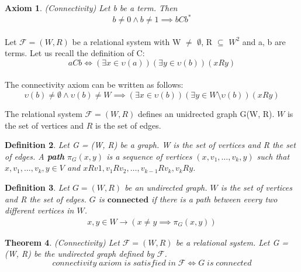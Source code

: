 \documentclass{article}
\newcommand\F{\mathcal{F}}
\newtheorem{theorem}{Theorem}[section]
\newtheorem{axiom}[theorem]{Axiom}
\newtheorem{defn}[theorem]{Definition}
\begin{document}
	\begin{axiom}
		(Connectivity) Let b be a term. Then
		\label{connectivity-theorem}\begin{equation}
			b \neq 0 \land b \neq 1 \implies bCb^*
		\end{equation}
	\end{axiom}

	\paragraph{} Let $\F = (W, R)$ be a relational system with W $\neq$ $\emptyset$, R $\subseteq$ $W^2$ and a, b are terms. Let us recall the definition of C:
	\begin{equation*}
		aCb \iff (\exists x \in \upsilon(a)) (\exists y \in \upsilon(b))(xRy)
	\end{equation*}

	\paragraph{} The connectivity axiom can be written as follows:
	\begin{equation}
		\upsilon(b) \neq \emptyset \land \upsilon(b) \neq W \implies (\exists x \in \upsilon(b)) (\exists y \in W \setminus \upsilon(b))(xRy)
	\end{equation}

	The relational system $\F = (W, R)$ defines an unidrected graph G(W, R). $W$ is the set of vertices and $R$ is the set of edges.

	\begin{defn}
		Let G = (W, R) be a graph. W is the set of vertices and R the set of edges. A \textbf{path} $\pi_G(x, y)$ is a sequence of vertices $(x, v_1, \dotsc , v_k, y)$ such that $x,  v_1,\dotsc,v_k, y \in V$ and $xRv1,v_1Rv_2,\dotsc, v_{k-1}Rv_k, v_kRy$.
	\end{defn}

	\begin{defn}
		Let $G = (W, R)$ be an undirected graph. $W$ is the set of vertices and R the set of edges. $G$ is $\mathbf{connected}$ if there is a path between every two different vertices in $W$.
		\begin{align*}
			x, y \in W \rightarrow (x \neq y \implies \pi_G(x, y))
		\end{align*}
	\end{defn}

	\begin{theorem}
		(Connectivity) Let $\F = (W, R)$ be a relational system. Let G = (W, R) be the undirected graph defined by $\F$.
		\label{connectivity-theorem}\begin{equation}
			connectivity \; axiom \; is \; satisfied\; in \; \F \iff
			G \; is \; connected
		\end{equation}
	\end{theorem}
\end{document}
